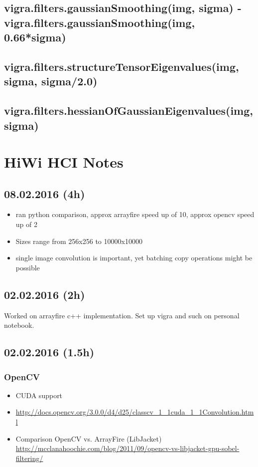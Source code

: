 \documentclass[12pt,a4paper]{article}
\begin{document}
  \subsection{vigra.filters.gaussianSmoothing(img, sigma) - vigra.filters.gaussianSmoothing(img, 0.66*sigma)}
  \subsection{vigra.filters.structureTensorEigenvalues(img, sigma, sigma/2.0)}
  \subsection{vigra.filters.hessianOfGaussianEigenvalues(img, sigma)}


\section{HiWi HCI Notes}

\subsection{08.02.2016 (4h)}
  \begin{itemize}
    \item ran python comparison, approx arrayfire speed up of 10, approx opencv speed up of 2
    \item Sizes range from 256x256 to 10000x10000
    \item single image convolution is important, yet batching copy operations might be possible
  \end{itemize}
  

\subsection{02.02.2016 (2h)}
  Worked on arrayfire c++ implementation. Set up vigra and such on personal notebook.

\subsection{02.02.2016 (1.5h)}

  \subsubsection{OpenCV}
    \begin{itemize}
      \item CUDA support
      \item \url{http://docs.opencv.org/3.0.0/d4/d25/classcv_1_1cuda_1_1Convolution.html}
      \item Comparison OpenCV vs. ArrayFire (LibJacket) \url{http://mcclanahoochie.com/blog/2011/09/opencv-vs-libjacket-gpu-sobel-filtering/}
    \end{itemize}
\end{document}
